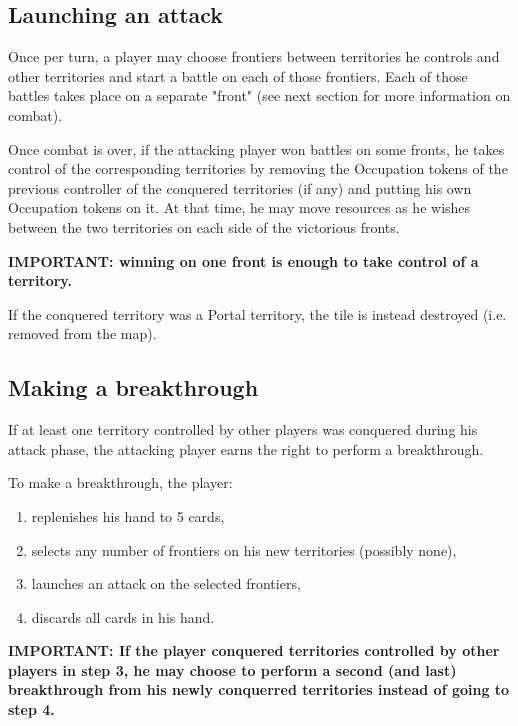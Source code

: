 \documentclass[a4paper]{article}
\begin{document}
\subsection{Launching an attack}

    Once per turn, a player may choose frontiers between territories he controls and other
    territories and start a battle on each of those frontiers.
    Each of those battles takes place on a separate "front"
    (see next section for more information on combat).

    Once combat is over, if the attacking player won battles on some fronts,
    he takes control of the corresponding territories by removing the Occupation tokens of
    the previous controller of the conquered territories (if any) and putting his own
    Occupation tokens on it.
    At that time, he may move resources as he wishes between the two territories on each
    side of the victorious fronts.
    
    \hspace{-1.5em} \textbf{
    IMPORTANT: winning on one front is enough to take control of a territory.
    }

    If the conquered territory was a Portal territory, the tile is instead destroyed
    (i.e. removed from the map).


\subsection{Making a breakthrough}

    If at least one territory controlled by other players was conquered during his attack
    phase, the attacking player earns the right to perform a breakthrough.

    \hspace{-1.5em} To make a breakthrough, the player:
    \vspace{-1.3em}
    \begin{enumerate}
        \item replenishes his hand to 5 cards,
        \item selects any number of frontiers on his new territories (possibly none),
        \item launches an attack on the selected frontiers,
        \item discards all cards in his hand.
    \end{enumerate}
    
    \vspace{-0.7em}
    \hspace{-1.5em} \textbf{
    IMPORTANT: If the player conquered territories controlled by other players in step 3,
    he may choose to perform a second
    (and last) breakthrough from his newly conquerred territories instead of going to
    step 4.
    }
    
\end{document}

